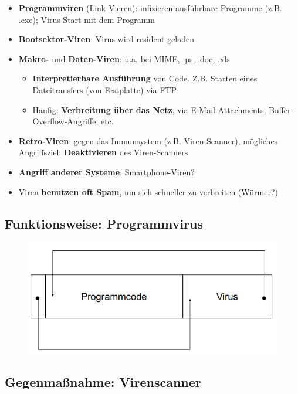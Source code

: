 \documentclass[openany]{book}
\begin{document}
\begin{itemize}
    \item \textbf{Programmviren} (Link-Vieren): infizieren ausführbare Programme (z.B. .exe); Virus-Start mit dem Programm
    \item \textbf{Bootsektor-Viren}: Virus wird resident geladen
    \item \textbf{Makro-} und \textbf{Daten-Viren}: u.a. bei MIME, .ps, .doc, .xls
    \begin{itemize}
        \item \textbf{Interpretierbare Ausführung} von Code. Z.B. Starten eines Dateitransfers (von Festplatte) via FTP
        \item Häufig: \textbf{Verbreitung über das Netz}, via E-Mail Attachments, Buffer-Overflow-Angriffe, etc.
    \end{itemize}
    \item \textbf{Retro-Viren}: gegen das Immunsystem (z.B. Viren-Scanner), mögliches Angriffsziel: \textbf{Deaktivieren} des Viren-Scanners
    \item \textbf{Angriff anderer Systeme}: Smartphone-Viren?
    \item Viren \textbf{benutzen oft Spam}, um sich schneller zu verbreiten (Würmer?)
\end{itemize}

\subsection{Funktionsweise: Programmvirus}

\begin{figure}[h!]
    \centering
    \includegraphics[width=0.85\linewidth]{Pics/Virus.PNG}
\end{figure}

\subsection{Gegenmaßnahme: Virenscanner}
\end{document}
